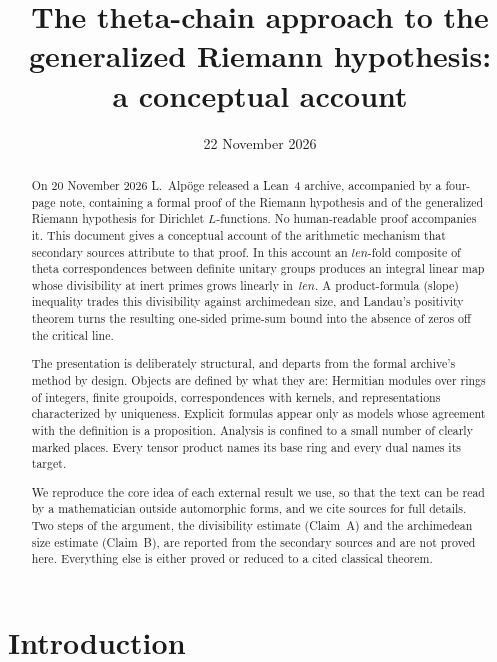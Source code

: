 \documentclass[11pt]{amsart}
\theoremstyle{definition}
\theoremstyle{remark}
\newcommand{\len}{\mathit{len}}
\begin{document}
\title[The theta-chain approach to GRH]{The theta-chain approach to the generalized Riemann hypothesis:\\ a conceptual account}
\date{22 November 2026}

\begin{abstract}
On 20 November 2026 L.~Alp\"oge released a Lean~4 archive, accompanied by a four-page note, containing a formal proof of the Riemann hypothesis and of the generalized Riemann hypothesis for Dirichlet $L$-functions. No human-readable proof accompanies it. This document gives a conceptual account of the arithmetic mechanism that secondary sources attribute to that proof. In this account an $\len$-fold composite of theta correspondences between definite unitary groups produces an integral linear map whose divisibility at inert primes grows linearly in~$\len$. A product-formula (slope) inequality trades this divisibility against archimedean size, and Landau's positivity theorem turns the resulting one-sided prime-sum bound into the absence of zeros off the critical line.

The presentation is deliberately structural, and departs from the formal archive's method by design. Objects are defined by what they are: Hermitian modules over rings of integers, finite groupoids, correspondences with kernels, and representations characterized by uniqueness. Explicit formulas appear only as models whose agreement with the definition is a proposition. Analysis is confined to a small number of clearly marked places. Every tensor product names its base ring and every dual names its target.

We reproduce the core idea of each external result we use, so that the text can be read by a mathematician outside automorphic forms, and we cite sources for full details. Two steps of the argument, the divisibility estimate (Claim~A) and the archimedean size estimate (Claim~B), are reported from the secondary sources and are not proved here. Everything else is either proved or reduced to a cited classical theorem.
\end{abstract}

\maketitle
\tableofcontents

\section{Introduction}
\end{document}
